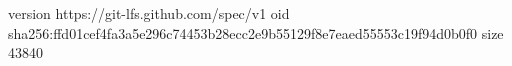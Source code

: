 version https://git-lfs.github.com/spec/v1
oid sha256:ffd01cef4fa3a5e296c74453b28ecc2e9b55129f8e7eaed55553c19f94d0b0f0
size 43840

